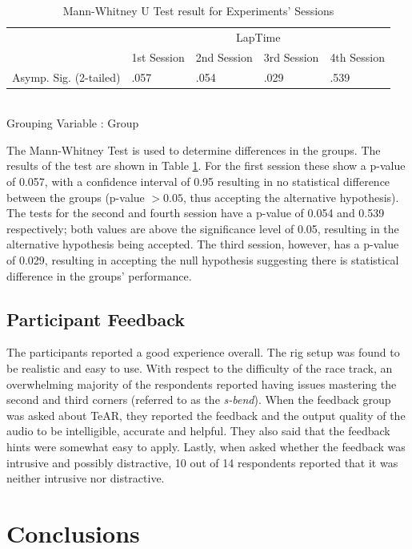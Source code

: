 \documentclass{sig-alternate}
\begin{document}
\begin{table}
	\centering
	\begin{tabular}{|l|l|l|l|l|}
		\hline
		& \multicolumn{4}{c|}{LapTime}            \\ \cline{2-5} 
		& 1st Session & 2nd Session & 3rd Session & 4th Session \\ \hline
		Asymp. Sig. (2-tailed) & .057 & .054        & .029        & .539        \\ \hline
	\end{tabular}\\
	Grouping Variable : Group
	\caption[Mann-Whitney U Test for Experiments' Sessions]{Mann-Whitney U Test result for Experiments' Sessions}
	\label{table:Mann-Whitney-Sessions}
\end{table}

The Mann-Whitney Test is used to determine differences in the groups. The results of the test are shown in Table \ref{table:Mann-Whitney-Sessions}. For the first session these show a p-value of 0.057, with a confidence interval of 0.95 resulting in no statistical difference between the groups (p-value $> 0.05$, thus accepting the alternative hypothesis).  The tests for the second and fourth session have a p-value of 0.054 and 0.539 respectively; both values are above the significance level of 0.05, resulting in the alternative hypothesis being accepted. The third session, however, has a p-value of 0.029, resulting in accepting the null hypothesis suggesting there is statistical difference in the groups' performance.

\def \methodname {TeAR\xspace}
\def \methodnamefull {Telemetry Assisted Racing\xspace}

\subsection{Participant Feedback}
The participants reported a good experience overall. The rig setup was found to be realistic and easy to use. With respect to the difficulty of the race track, an overwhelming majority of the respondents reported having issues mastering the second and third corners (referred to as the \emph{s-bend}). When the feedback group was asked about \methodname, they reported the feedback and the output quality of the audio to be intelligible, accurate and helpful. They also said that the feedback hints were somewhat easy to apply. Lastly, when asked whether the feedback was intrusive and possibly distractive, 10 out of 14 respondents reported that it was neither intrusive nor distractive.

\section{Conclusions}



\end{document}
